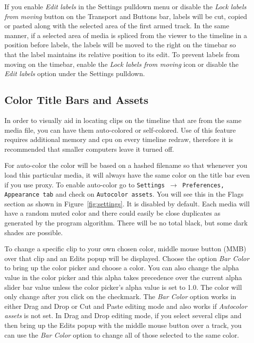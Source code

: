If you enable \emph{Edit labels} in the Settings pulldown menu or disable the \emph{Lock labels from moving}
button on the Transport and Buttons bar, labels will be cut, copied or pasted along with the selected
area of the first armed track. 
In the same manner, if a selected area of media is spliced from the viewer to the timeline in a position 
before labels, the labels will be moved to the right on the timebar so that the label maintains its 
relative position to its edit. 
To prevent labels from moving on the timebar, enable the \emph{Lock labels from moving} icon or
disable the \emph{Edit labels} option under the Settings pulldown.

\subsection{Color Title Bars and Assets}%
\label{sub:color_title_bars_and_assets}

In order to visually aid in locating clips on the timeline that are from the same media file, you can have them auto-colored or self-colored.  
Use of this feature requires additional memory and cpu on every timeline redraw, therefore it is recommended that smaller computers leave it turned off.

For auto-color the color will be based on a hashed filename so that whenever you load this particular media, it will always have the same color on the title bar even if you use proxy.  
To enable auto-color go to \texttt{Settings $\rightarrow$ Preferences, Appearance tab} and check on \texttt{Autocolor assets}. You will see this in the Flags section
as shown in Figure~\ref{fig:settings}.  It is disabled by default.  
Each media will have a random muted color and there could easily be close duplicates as generated by the program algorithm.  There will be no total black, but some dark shades are possible.  

To change a specific clip to your own chosen color, middle mouse button (MMB) over that clip and an Edits popup will be displayed.  
Choose the option \textit{Bar Color} to bring up the color picker and choose a color.   
You can also change the alpha value in the color picker and this alpha takes precedence over the current alpha slider bar value unless the color picker's alpha value is set to 1.0.   
The color will only change after you click on the checkmark.  
The \emph{Bar Color} option works in either Drag and Drop or Cut and Paste editing mode and also works if \textit{Autocolor assets} is not set.  
In Drag and Drop editing mode, if you select several clips and then bring up the Edits popup with the middle mouse button over a track, you can use the \emph{Bar Color} option to change all of those selected to the same color.

